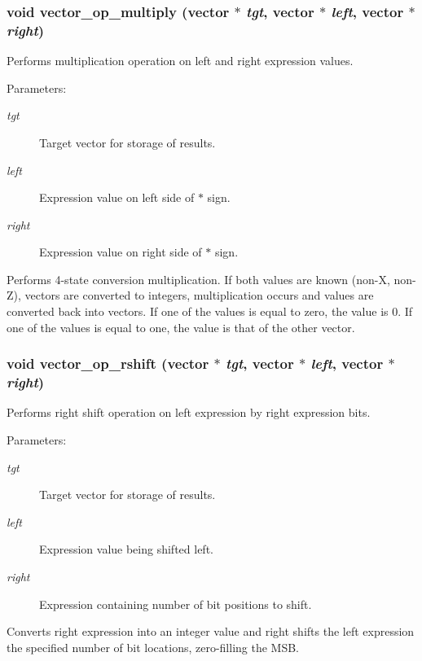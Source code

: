 \subsubsection{\setlength{\rightskip}{0pt plus 5cm}void vector\_\-op\_\-multiply ({\bf vector} $\ast$ {\em tgt}, {\bf vector} $\ast$ {\em left}, {\bf vector} $\ast$ {\em right})}\label{vector_8h_a28}


Performs multiplication operation on left and right expression values.

\begin{Desc}
\item[Parameters: ]\par
\begin{description}
\item[{\em 
tgt}]Target vector for storage of results. \item[{\em 
left}]Expression value on left side of $\ast$ sign. \item[{\em 
right}]Expression value on right side of $\ast$ sign.\end{description}
\end{Desc}
Performs 4-state conversion multiplication. If both values are known (non-X, non-Z), vectors are converted to integers, multiplication occurs and values are converted back into vectors. If one of the values is equal to zero, the value is 0. If one of the values is equal to one, the value is that of the other vector. 
\subsubsection{\setlength{\rightskip}{0pt plus 5cm}void vector\_\-op\_\-rshift ({\bf vector} $\ast$ {\em tgt}, {\bf vector} $\ast$ {\em left}, {\bf vector} $\ast$ {\em right})}\label{vector_8h_a25}


Performs right shift operation on left expression by right expression bits.

\begin{Desc}
\item[Parameters: ]\par
\begin{description}
\item[{\em 
tgt}]Target vector for storage of results. \item[{\em 
left}]Expression value being shifted left. \item[{\em 
right}]Expression containing number of bit positions to shift.\end{description}
\end{Desc}
Converts right expression into an integer value and right shifts the left expression the specified number of bit locations, zero-filling the MSB. 
